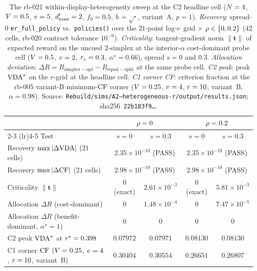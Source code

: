 \begin{table}[t]
  \centering
  \small
  \caption{The rb-021 within-display-heterogeneity sweep at the C2
    headline cell ($N = 4$, $V = 0.5$, $v = 5$,
    $d'_{\max} = 2$, $f_0 = 0.5$, $h = \sqrt{\cdot}$, variant~A,
    $p = 1$). \emph{Recovery}: spread-$0$ \texttt{er\_full\_policy}
    vs.\ \texttt{policies()} over the $21$-point log-$r$ grid
    $\times$ $\rho \in \{0, 0.2\}$ (42 cells, rb-020 contract
    tolerance $10^{-9}$). \emph{Criticality}: tangent-gradient norm
    $\|\boldsymbol{t}\|$ of expected reward on the uncued $2$-simplex
    at the interior-$\alpha$ cost-dominant probe cell
    ($V = 0.5$, $v = 2$, $r_c = 0.3$,
    $\alpha^\star = 0.66$), spread $s = 0$ and $0.3$. \emph{Allocation
    deviation}: $\Delta R = R_{\mathrm{simplex-opt}} -
    R_{\mathrm{equal-split}}$ at the same probe cell. \emph{C2 peak}:
    peak $\mathrm{VDA}^\star$ on the $r$-grid at the headline cell. \emph{C1
    corner CF}: criterion fraction at the rb-005 variant-B
    minimum-$\mathrm{CF}$ corner ($V = 0.25$, $v = 4$,
    $r = 10$, variant~B, $\alpha = 0.98$). Source:
    \texttt{Rebuild/sims/A2--heterogeneous-r/}\allowbreak\texttt{output/results.json};
    sha256~\texttt{22b183f9\ldots}.}
  \label{tab:a2-rb021-summary}
  \begin{tabular}{l c c c c}
    \toprule
                                 & \multicolumn{2}{c}{$\rho = 0$} & \multicolumn{2}{c}{$\rho = 0.2$} \\
    \cmidrule(lr){2-3} \cmidrule(lr){4-5}
    Test                          & $s = 0$ & $s = 0.3$ & $s = 0$ & $s = 0.3$ \\
    \midrule
    Recovery $\max|\Delta\mathrm{VDA}|$ ($21$ cells)
      & \multicolumn{2}{c}{$2.35\!\times\!10^{-10}$ (PASS)}
      & \multicolumn{2}{c}{$2.35\!\times\!10^{-10}$ (PASS)} \\
    Recovery $\max|\Delta\mathrm{CF}|$ ($21$ cells)
      & \multicolumn{2}{c}{$2.98\!\times\!10^{-10}$ (PASS)}
      & \multicolumn{2}{c}{$2.98\!\times\!10^{-10}$ (PASS)} \\
    \midrule
    Criticality $\|\boldsymbol{t}\|$
      & $0$ (exact) & $2.61\!\times\!10^{-3}$
      & $0$ (exact) & $5.81\!\times\!10^{-3}$ \\
    Allocation $\Delta R$ (cost-dominant)
      & $0$ & $1.48\!\times\!10^{-4}$
      & $0$ & $7.47\!\times\!10^{-5}$ \\
    Allocation $\Delta R$ (benefit-dominant, $\alpha^\star = 1$)
      & $0$ & $0$ & $0$ & $0$ \\
    \midrule
    C2 peak $\mathrm{VDA}^\star$ at $r^\star = 0.398$
      & $0.07972$ & $0.07971$ & $0.08130$ & $0.08130$ \\
    \midrule
    C1 corner $\mathrm{CF}$ ($V = 0.25$, $v = 4$, $r = 10$, variant~B)
      & $0.30404$ & $0.30554$ & $0.26651$ & $0.26807$ \\
    \bottomrule
  \end{tabular}
\end{table}

